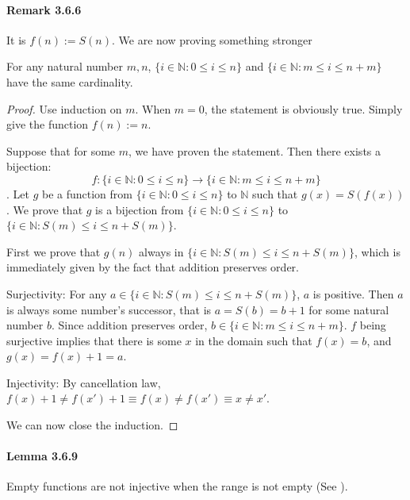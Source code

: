 \paragraph{Remark 3.6.6}
It is $f(n) := S(n)$. We are now proving something stronger
\begin{lem} \label{lem3.6.6}
For any natural number $m,n$, $\{i \in \mathbb{N}:0\leq i\leq n\}$ and 
$\{i \in \mathbb{N}:m\leq i\leq n+m\}$ have the same cardinality.
\end{lem}
\begin{proof}
Use induction on $m$. When $m=0$, the statement is obviously true. Simply give the function $f(n):=n$.

Suppose that for some $m$, we have proven the statement. Then there exists a bijection: 
\[
f:\{i \in \mathbb{N}:0\leq i\leq n\} \rightarrow \{i \in \mathbb{N}:m\leq i\leq n+m\}
\].
Let $g$ be a function from $\{i \in \mathbb{N}:0\leq i\leq n\}$ to $\mathbb{N}$ such that 
$g(x) = S(f(x))$. We prove that $g$ is a bijection from $\{i \in \mathbb{N}:0\leq i\leq n\}$ to 
$\{i \in \mathbb{N}:S(m)\leq i\leq n+S(m)\}$.

First we prove that $g(n)$ always in $\{i \in \mathbb{N}:S(m)\leq i\leq n+S(m)\}$, which is immediately 
given by the fact that addition preserves order. 

Surjectivity: For any $a \in \{i \in \mathbb{N}:S(m)\leq i\leq n+S(m)\}$, $a$ is positive. Then $a$ is 
always some number's successor, that is $a = S(b) = b+1$ for some natural number $b$. Since addition 
preserves order, $b \in \{i \in \mathbb{N}:m\leq i\leq n+m\}$. $f$ being surjective implies that there is 
some $x$ in the domain such that $f(x) = b$, and $g(x) = f(x) + 1 = a$.

Injectivity: By cancellation law, $f(x) + 1 \neq f(x') + 1 \equiv f(x) \neq f(x') \equiv x \neq x'$.

We can now close the induction.
\end{proof}

\paragraph{Lemma 3.6.9}
Empty functions are not injective when the range is not empty (See ). 

